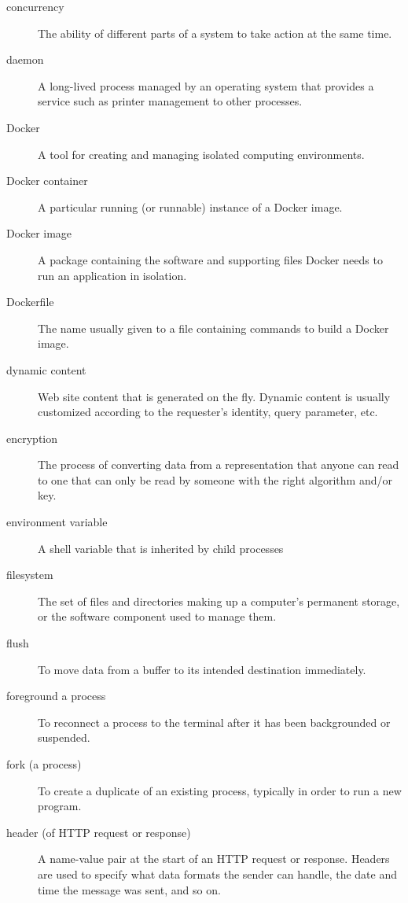 \documentclass[krantzl]{krantz}
\begin{document}
\begin{description}
\item[concurrency] The ability of different parts of a system to take action at the same time.

\item[daemon] A long-lived process managed by an operating system that provides a service such as printer management to other processes.

\item[Docker] A tool for creating and managing isolated computing environments.

\item[Docker container] A particular running (or runnable) instance of a Docker image.

\item[Docker image] A package containing the software and supporting files Docker needs to run an application in isolation.

\item[Dockerfile] The name usually given to a file containing commands to build a Docker image.

\item[dynamic content] Web site content that is generated on the fly. Dynamic content is usually customized according to the requester’s identity, query parameter, etc.

\item[encryption] The process of converting data from a representation that anyone can read to one that can only be read by someone with the right algorithm and/or key.

\item[environment variable] A shell variable that is inherited by child processes

\item[filesystem] The set of files and directories making up a computer’s permanent storage, or the software component used to manage them.

\item[flush] To move data from a buffer to its intended destination immediately.

\item[foreground a process] To reconnect a process to the terminal after it has been backgrounded or suspended.

\item[fork (a process)] To create a duplicate of an existing process, typically in order to run a new program.

\item[header (of HTTP request or response)] A name-value pair at the start of an HTTP request or response. Headers are used to specify what data formats the sender can handle, the date and time the message was sent, and so on.


\end{description}
\end{document}
